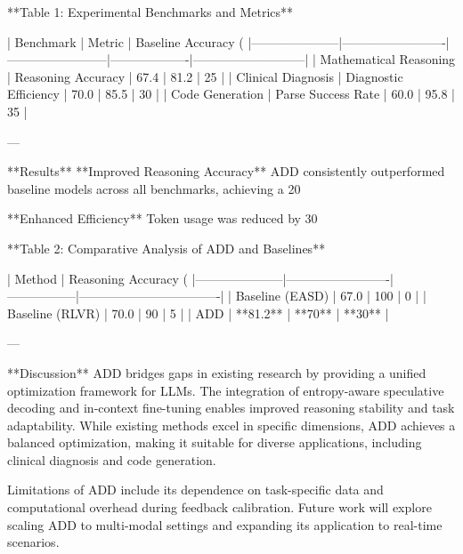 **Table 1: Experimental Benchmarks and Metrics**  

| Benchmark          | Metric                  | Baseline Accuracy (%
|---------------------|-------------------------|------------------------|-------------------|---------------------------|  
| Mathematical Reasoning | Reasoning Accuracy     | 67.4                  | 81.2             | 25                        |  
| Clinical Diagnosis   | Diagnostic Efficiency  | 70.0                  | 85.5             | 30                        |  
| Code Generation      | Parse Success Rate     | 60.0                  | 95.8             | 35                        |  

---

**Results**  
**Improved Reasoning Accuracy**  
ADD consistently outperformed baseline models across all benchmarks, achieving a 20%

**Enhanced Efficiency**  
Token usage was reduced by 30%

**Table 2: Comparative Analysis of ADD and Baselines**  

| Method              | Reasoning Accuracy (%
|---------------------|-------------------------|-----------------|----------------------------------|  
| Baseline (EASD)     | 67.0                  | 100             | 0                                |  
| Baseline (RLVR)     | 70.0                  | 90              | 5                                |  
| ADD                 | **81.2**              | **70**          | **30**                           |  

---

**Discussion**  
ADD bridges gaps in existing research by providing a unified optimization framework for LLMs. The integration of entropy-aware speculative decoding and in-context fine-tuning enables improved reasoning stability and task adaptability. While existing methods excel in specific dimensions, ADD achieves a balanced optimization, making it suitable for diverse applications, including clinical diagnosis and code generation.  

Limitations of ADD include its dependence on task-specific data and computational overhead during feedback calibration. Future work will explore scaling ADD to multi-modal settings and expanding its application to real-time scenarios.  

